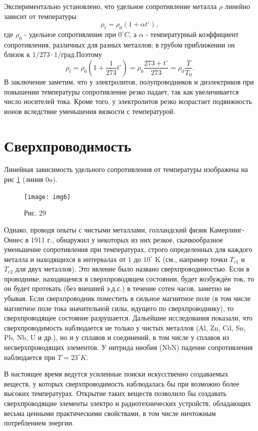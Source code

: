 \documentclass[a4paper,10pt]{book}
\begin{document}
Экспериментально установлено, что удельное сопротивление металла $\rho$ линейно зависит от температуры
\begin{equation}\label{168}
 \rho_t = \rho_0(1 + \alpha t^\circ),
\end{equation}
где $\rho_0$ - удельное сопротивление при $0^\circ C$, а $\alpha$ - температурный коэффициент сопротивления, различных для разных металлов;
в грубом приближении он близок к $1/273\cdot1/\text{град}$.Поэтому
\begin{equation}\label{168a}
 \rho_t = \rho_0(1 + \frac{1}{273}t^\circ) = \rho_0 \frac{273 + t^\circ}{273} = \rho_0\frac{T}{T_0}.
\end{equation}
В заключение заметим, что у электролитов, полупроводников и диэлектриков при повышении температуры сопротивление резко падает, так как увеличивается
число носителей тока. Кроме того, у электролитов резко возрастает подвижность ионов вследствие уменьшения вязкости с температурой.
\section{Сверхпроводимость}
Линейная зависимость удельного сопротивления от температуры изображена на рис \ref{img7} (линия $0a$).
\begin{figure}[h]
\texttt{[image: img6]}
\caption{Рис. 29}
\label{img7}
\end{figure}
Однако, проводя опыты с чистыми металлами,
голландский физик Камерлинг-Оннес в 1911 г., обнаружил у некоторых из них резкое, скачкообразное уменьшение сопротивления при температурах,
строго определенных для каждого металла и находящихся в интервалах от $1$ до $10^\circ$ K (см., например точки $T_{c1}$ и $T_{c2}$ для двух
металлов). Это явление было названо сверхпроводимостью. Если в проводнике, находящемся в сверхпроводящем состоянии, будет возбуждён ток,
то он будет протекать (без внешней э.д.с.) в течение сотен часов, заметно не убывая. Если сверхпроводник поместить в сильное магнитное поле 
(в том числе магнитное поле тока значительной силы, идущего по сверхпроводнику), то сверхпроводящее состояние разрушается. Дальейшие исследования
показали, что сверхпроводимость наблюдается не только у чистых металлов (Al, Zn, Cd, Sn, Pb, Nb, U и др.), но и у сплавов и соединений, в 
том числе у сплавов из несверхпроводящих элементов. У нитрида ниобия (NbN) падение сопротивления наблюдается при $T = 23^\circ K$.

В настоящее время ведутся усиленные поиски искусственно создаваемых веществ, у которых сверхпроводимость наблюдалась бы при возможно более
высоких температурах. Открытие таких веществ позволило бы создавать сверхпроводящие элементы электро и радиотехнических устройств, обладающих
весьма ценными практическими свойствами, в том числе ничтожным потреблением энергии.
\end{document}
